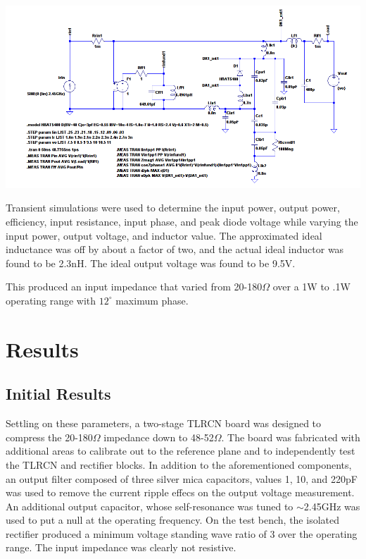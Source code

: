 \documentclass[11pt, a4paper]{article}
\begin{document}
\begin{center}
\includegraphics[width=.7\textwidth]{img/sim-schem.png}
\end{center}

Transient simulations were used to determine the input power, output power, efficiency, input resistance, input phase, and peak diode voltage while varying the input power, output voltage, and inductor value.
The approximated ideal inductance was off by about a factor of two, and the actual ideal inductor was found to be 2.3nH.  
The ideal output voltage was found to be 9.5V.

This produced an input impedance that varied from 20-180$\Omega$ over a 1W to .1W operating range with $12^\circ$ maximum phase.

\section{Results}
\subsection{Initial Results}

Settling on these parameters, a two-stage TLRCN board was designed to compress the 20-180$\Omega$ impedance down to 48-52$\Omega$.  
The board was fabricated with additional areas to calibrate out to the reference plane and to independently test the TLRCN and rectifier blocks.  
In addition to the aforementioned components, an output filter composed of three silver mica capacitors, values 1, 10, and 220pF was used to remove the current ripple effecs on the output voltage measurement.
An additional output capacitor, whose self-resonance was tuned to $\sim$2.45GHz was used to put a null at the operating frequency.
On the test bench, the isolated rectifier produced a minimum voltage standing wave ratio of 3 over the operating range.  
The input impedance was clearly not resistive.  
\end{document}
